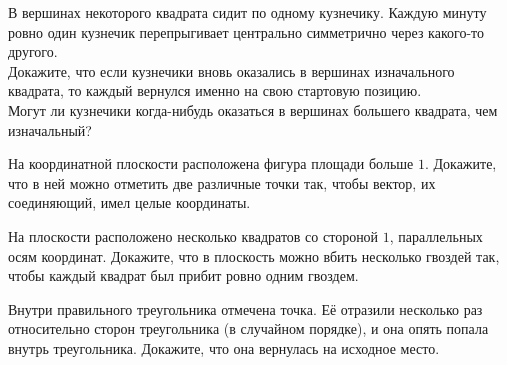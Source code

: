 \resetproblem \begingroup %
    \def\jeolmdate{9 июня 2018 г., пара 1}%
    \def\jeolmgroupname{Группа 9-1}%
    \def\jeolmauthors{Афризонов Д., Кушнир А., Тихонов~Ю.}%
\jeolmheader \endgroup


\begin{problems}

\item
В вершинах некоторого квадрата сидит по одному кузнечику. Каждую минуту ровно один кузнечик перепрыгивает центрально симметрично через какого-то другого.
\\
\subproblem Докажите, что если кузнечики вновь оказались в вершинах изначального квадрата, то каждый вернулся именно на свою стартовую позицию.
\\
\subproblem Могут ли кузнечики когда-нибудь оказаться в вершинах большего квадрата, чем изначальный?


\item На координатной плоскости расположена фигура площади больше $1$. Докажите, что в ней можно отметить две различные точки так, чтобы вектор, их соединяющий, имел целые координаты.

\item На плоскости расположено несколько квадратов со стороной $1$, параллельных осям координат. Докажите, что в плоскость можно вбить несколько гвоздей так, чтобы каждый квадрат был прибит ровно одним гвоздем.


\item Внутри правильного треугольника отмечена точка. Её отразили несколько раз относительно сторон треугольника (в случайном порядке), и она опять попала внутрь треугольника. Докажите, что она вернулась на исходное место.


\end{problems}
